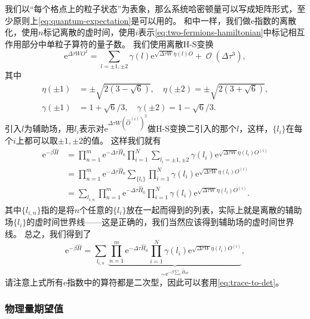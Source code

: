 \documentclass[hyperref, UTF8, a4paper]{ctexart}
\newcommand*{\ee}{\mathrm{e}}
\DeclareMathOperator{\bigO}{\mathcal{O}}
\renewcommand{\autoref}{\prettyref}
\begin{document}
我们以“每个格点上的粒子状态”为表象，那么系统哈密顿量可以写成矩阵形式，至少原则上\eqref{eq:quantum-expectation}是可以用的。
和\autoref{sec:worldline-mc}中一样，我们做$\ee$指数的离散化，使用$n$标记离散的虚时间，使用$i$表示\eqref{eq:two-fermions-hamiltonian}中标记相互作用部分中单粒子算符的量子数。
我们使用离散H-S变换
\begin{equation}
    \ee^{\Delta \tau W O^2} = \sum_{l = \pm 1, \pm 2} \gamma(l) \ee^{\sqrt{\Delta \tau W} \eta(l) O} + \bigO(\Delta \tau^3),
\end{equation}
其中
\begin{equation}
    \begin{aligned}
        \eta(\pm 1) &= \pm \sqrt{2(3-\sqrt{6})}, \quad \eta(\pm 2) = \pm \sqrt{2(3+\sqrt{6})}, \\
        \gamma(\pm 1) &= 1 + \sqrt{6}/3, \quad \gamma(\pm 2) = 1 - \sqrt{6}/3.
    \end{aligned}
\end{equation}
引入$l$为辅助场，用$l_i$表示对$\ee^{\Delta \tau W (\hat{O}^{(i)})^2}$做H-S变换二引入的那个$l$，这样，$\{l_i\}$在每个$i$上都可以取$\pm 1, \pm 2$的值。
这样我们就有
\[
    \begin{aligned}
        \ee^{-\beta \hat{H}} &= \prod_{n=1}^m \ee^{-\Delta \tau \hat{H}_0} \prod_{i=1}^N \sum_{l_i = \pm 1, \pm 2} \gamma(l_i) \ee^{\sqrt{\Delta \tau W} \eta(l_i) O^{(i)}} \\
        &= \prod_{n=1}^m \ee^{-\Delta \tau \hat{H}_0} \sum_{\{l_i\}} \prod_{i=1}^N \gamma(l_i) \ee^{\sqrt{\Delta \tau W} \eta(l_i) O^{(i)}} \\
        &= \sum_{{l_{i, n}}} \prod_{n=1}^m \ee^{-\Delta \tau \hat{H}_0} \prod_{i=1}^N \gamma(l_i) \ee^{\sqrt{\Delta \tau W} \eta(l_i) O^{(i)}}.
    \end{aligned}
\]
其中$\{l_{i,n}\}$指的是将$n$个任意的$\{l_i\}$放在一起而得到的列表，实际上就是离散的辅助场$\{l_i\}$的虚时间世界线——这是正确的，我们当然应该得到辅助场的虚时间世界线。
总之，我们得到了
\begin{equation}
    \ee^{-\beta \hat{H}} = \sum_{{l_{i, n}}} \underbrace{\prod_{n=1}^m \ee^{-\Delta \tau \hat{H}_0} \prod_{i=1}^N \gamma(l_i) \ee^{\sqrt{\Delta \tau W} \eta(l_i) O^{(i)}}}_{\sim \ee^{-\beta \sum_n \hat{H}_\text{eff}}},
    \label{eq:imaginary-time-path-integral}
\end{equation}
请注意上式所有$\ee$指数中的算符都是二次型，因此可以套用\eqref{eq:trace-to-det}。

\subsubsection{物理量期望值}
\end{document}
